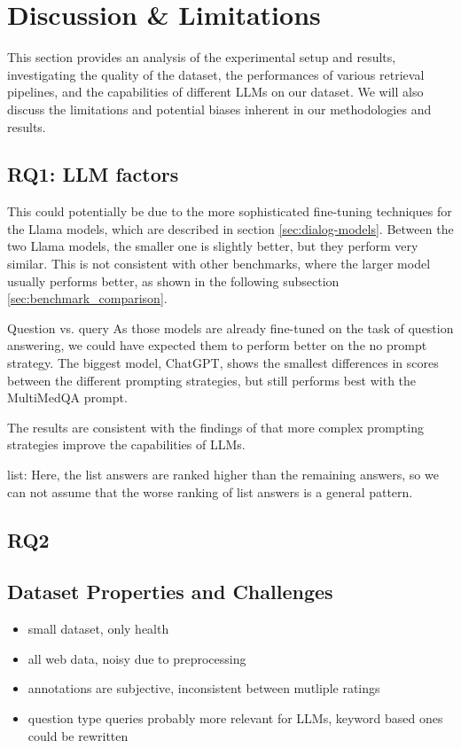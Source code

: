 \chapter{Discussion \& Limitations}\label{discussion}

This section provides an analysis of the experimental setup and results, investigating the quality of the dataset, the performances of various retrieval pipelines, and the capabilities of different LLMs on our dataset.
We will also discuss the limitations and potential biases inherent in our methodologies and results.

\section{RQ1: LLM factors}

This could potentially be due to the more sophisticated fine-tuning techniques for the Llama models, which are described in section \ref{sec:dialog-models}.
Between the two Llama models, the smaller one is slightly better, but they perform very similar.
This is not consistent with other benchmarks, where the larger model usually performs better, as shown in the following subsection \ref{sec:benchmark_comparison}.

Question vs. query
As those models are already fine-tuned on the task of question answering, we could have expected them to perform better on the no prompt strategy.
The biggest model, ChatGPT, shows the smallest differences in scores between the different prompting strategies, but still performs best with the MultiMedQA prompt.

The results are consistent with the findings of \cite{reynolds:2021:Prompt} that more complex prompting strategies improve the capabilities of LLMs.

list:
Here, the list answers are ranked higher than the remaining answers, so we can not assume that the worse ranking of list answers is a general pattern.
\section{RQ2}

\section{Dataset Properties and Challenges}
\begin{itemize}
    \item small dataset, only health
    \item all web data, noisy due to preprocessing
    \item annotations are subjective, inconsistent between mutliple ratings
    \item question type queries probably more relevant for LLMs, keyword based ones could be rewritten
\end{itemize}


